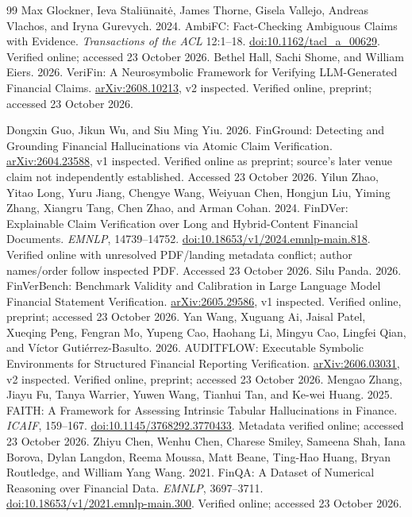\begin{thebibliography}{99}
 Max Glockner, Ieva Staliūnaitė, James Thorne, Gisela Vallejo, Andreas Vlachos, and Iryna Gurevych. 2024. AmbiFC: Fact-Checking Ambiguous Claims with Evidence. \emph{Transactions of the ACL} 12:1--18. \href{https://aclanthology.org/2024.tacl-1.1/}{doi:10.1162/tacl\_a\_00629}. Verified online; accessed 23 October 2026.
 Bethel Hall, Sachi Shome, and William Eiers. 2026. VeriFin: A Neurosymbolic Framework for Verifying LLM-Generated Financial Claims. \href{https://arxiv.org/abs/2608.10213}{arXiv:2608.10213}, v2 inspected. Verified online, preprint; accessed 23 October 2026.

\pbreak
{} Dongxin Guo, Jikun Wu, and Siu Ming Yiu. 2026. FinGround: Detecting and Grounding Financial Hallucinations via Atomic Claim Verification. \href{https://arxiv.org/abs/2604.23588}{arXiv:2604.23588}, v1 inspected. Verified online as preprint; source's later venue claim not independently established. Accessed 23 October 2026.
 Yilun Zhao, Yitao Long, Yuru Jiang, Chengye Wang, Weiyuan Chen, Hongjun Liu, Yiming Zhang, Xiangru Tang, Chen Zhao, and Arman Cohan. 2024. FinDVer: Explainable Claim Verification over Long and Hybrid-Content Financial Documents. \emph{EMNLP}, 14739--14752. \href{https://aclanthology.org/2024.emnlp-main.818/}{doi:10.18653/v1/2024.emnlp-main.818}. Verified online with unresolved PDF/landing metadata conflict; author names/order follow inspected PDF. Accessed 23 October 2026.
 Silu Panda. 2026. FinVerBench: Benchmark Validity and Calibration in Large Language Model Financial Statement Verification. \href{https://arxiv.org/abs/2605.29586}{arXiv:2605.29586}, v1 inspected. Verified online, preprint; accessed 23 October 2026.
 Yan Wang, Xuguang Ai, Jaisal Patel, Xueqing Peng, Fengran Mo, Yupeng Cao, Haohang Li, Mingyu Cao, Lingfei Qian, and Víctor Gutiérrez-Basulto. 2026. AUDITFLOW: Executable Symbolic Environments for Structured Financial Reporting Verification. \href{https://arxiv.org/abs/2606.03031}{arXiv:2606.03031}, v2 inspected. Verified online, preprint; accessed 23 October 2026.
 Mengao Zhang, Jiayu Fu, Tanya Warrier, Yuwen Wang, Tianhui Tan, and Ke-wei Huang. 2025. FAITH: A Framework for Assessing Intrinsic Tabular Hallucinations in Finance. \emph{ICAIF}, 159--167. \href{https://doi.org/10.1145/3768292.3770433}{doi:10.1145/3768292.3770433}. Metadata verified online; accessed 23 October 2026.
 Zhiyu Chen, Wenhu Chen, Charese Smiley, Sameena Shah, Iana Borova, Dylan Langdon, Reema Moussa, Matt Beane, Ting-Hao Huang, Bryan Routledge, and William Yang Wang. 2021. FinQA: A Dataset of Numerical Reasoning over Financial Data. \emph{EMNLP}, 3697--3711. \href{https://aclanthology.org/2021.emnlp-main.300/}{doi:10.18653/v1/2021.emnlp-main.300}. Verified online; accessed 23 October 2026.

\end{thebibliography}
